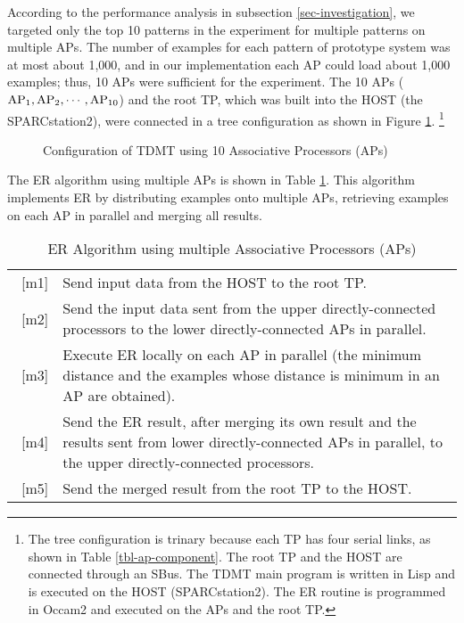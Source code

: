 According to the performance analysis in subsection
\ref{sec-investigation}, we targeted 
only the 
top 10 patterns in the experiment for multiple patterns on multiple APs. 
The number of examples for each pattern of prototype system was
at most about 1,000, 
and in  our implementation each AP could load about 1,000 examples; thus,
10 APs were sufficient for the experiment.
 The 10 APs ($\rm AP_1, AP_2,\cdots, AP_{10}$) and the root TP,
which was built into the HOST (the SPARCstation2), were connected in a tree
configuration as shown in Figure \ref{fig:fig-config-mptdmt}.
 \footnote{The tree configuration is trinary because each TP has
four serial links, as shown in Table \ref{tbl-ap-component}. 
The root TP and the HOST are connected through an SBus.
The TDMT main program is written in Lisp
and is executed on the HOST (SPARCstation2). The ER routine is
programmed in Occam2 and executed on the APs and the root TP.}

\begin{figure}[h]
  \begin{center}
    \caption{Configuration of TDMT using 10 Associative Processors (APs)}
    \label{fig:fig-config-mptdmt}
  \end{center}
\end{figure}

The ER algorithm
using multiple APs\cite{Higuchi94,Oi94} is shown in Table \ref{tbl-algo-ebmt}.
This algorithm implements ER by distributing examples  onto multiple APs,
retrieving examples on each AP in parallel and merging all results.

\begin{table}[t]
  \begin{center}
    \caption{ER Algorithm using multiple Associative Processors (APs)}
    \label{tbl-algo-ebmt}
    \tabcolsep=1mm
    \begin{tabular}{|cp{130mm}@{\hspace*{2mm}}|} \hline
      \strut~[m1] & Send input data from the HOST to the root TP.\\
      \strut~[m2] & Send the input data sent from the upper  
                directly-connected processors 
                to the lower directly-connected APs in parallel.\\ 
      \strut~[m3] & Execute ER locally on each AP in parallel
            (the minimum
            distance and the examples whose
            distance is minimum in an AP are obtained).\\ 
      \strut~[m4] & Send the ER result, after merging 
            its own result and the results sent from lower directly-connected 
            APs in parallel,
            to the upper directly-connected processors.\\
      \strut~[m5] & Send the merged result from the root TP to the HOST.\\ \hline
    \end{tabular}
  \end{center}
\end{table}

